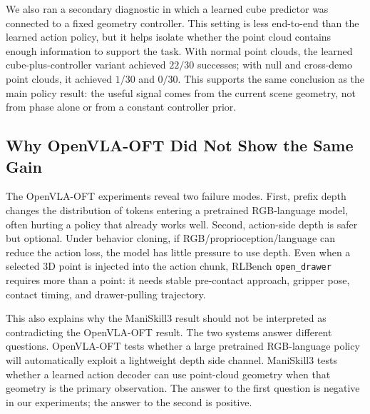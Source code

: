 \documentclass[conference]{IEEEtran}
\begin{document}
We also ran a secondary diagnostic in which a learned cube predictor was connected to a fixed geometry controller. This setting is less end-to-end than the learned action policy, but it helps isolate whether the point cloud contains enough information to support the task. With normal point clouds, the learned cube-plus-controller variant achieved $22/30$ successes; with null and cross-demo point clouds, it achieved $1/30$ and $0/30$. This supports the same conclusion as the main policy result: the useful signal comes from the current scene geometry, not from phase alone or from a constant controller prior.

\begin{table}[t]
\centering
\caption{Secondary ManiSkill3 geometry diagnostic.}
\label{tab:secondary}
\end{table}

\subsection{Why OpenVLA-OFT Did Not Show the Same Gain}

The OpenVLA-OFT experiments reveal two failure modes. First, prefix depth changes the distribution of tokens entering a pretrained RGB-language model, often hurting a policy that already works well. Second, action-side depth is safer but optional. Under behavior cloning, if RGB/proprioception/language can reduce the action loss, the model has little pressure to use depth. Even when a selected 3D point is injected into the action chunk, RLBench \texttt{open\_drawer} requires more than a point: it needs stable pre-contact approach, gripper pose, contact timing, and drawer-pulling trajectory.

This also explains why the ManiSkill3 result should not be interpreted as contradicting the OpenVLA-OFT result. The two systems answer different questions. OpenVLA-OFT tests whether a large pretrained RGB-language policy will automatically exploit a lightweight depth side channel. ManiSkill3 tests whether a learned action decoder can use point-cloud geometry when that geometry is the primary observation. The answer to the first question is negative in our experiments; the answer to the second is positive.
\end{document}
